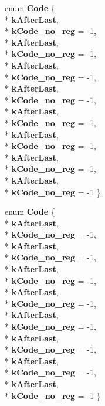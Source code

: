 \begin{DoxyCompactItemize}
\item 
enum {\bfseries Code} \{ \\*
{\bfseries k\+After\+Last}, 
\\*
{\bfseries k\+Code\+\_\+no\+\_\+reg} = -\/1, 
\\*
{\bfseries k\+After\+Last}, 
\\*
{\bfseries k\+Code\+\_\+no\+\_\+reg} = -\/1, 
\\*
{\bfseries k\+After\+Last}, 
\\*
{\bfseries k\+Code\+\_\+no\+\_\+reg} = -\/1, 
\\*
{\bfseries k\+After\+Last}, 
\\*
{\bfseries k\+Code\+\_\+no\+\_\+reg} = -\/1, 
\\*
{\bfseries k\+After\+Last}, 
\\*
{\bfseries k\+Code\+\_\+no\+\_\+reg} = -\/1, 
\\*
{\bfseries k\+After\+Last}, 
\\*
{\bfseries k\+Code\+\_\+no\+\_\+reg} = -\/1, 
\\*
{\bfseries k\+After\+Last}, 
\\*
{\bfseries k\+Code\+\_\+no\+\_\+reg} = -\/1, 
\\*
{\bfseries k\+After\+Last}, 
\\*
{\bfseries k\+Code\+\_\+no\+\_\+reg} = -\/1
 \}\hypertarget{structv8_1_1internal_1_1_register_adca23c370f4ac91047f79bd63778e75c}{}\label{structv8_1_1internal_1_1_register_adca23c370f4ac91047f79bd63778e75c}

\item 
enum {\bfseries Code} \{ \\*
{\bfseries k\+After\+Last}, 
\\*
{\bfseries k\+Code\+\_\+no\+\_\+reg} = -\/1, 
\\*
{\bfseries k\+After\+Last}, 
\\*
{\bfseries k\+Code\+\_\+no\+\_\+reg} = -\/1, 
\\*
{\bfseries k\+After\+Last}, 
\\*
{\bfseries k\+Code\+\_\+no\+\_\+reg} = -\/1, 
\\*
{\bfseries k\+After\+Last}, 
\\*
{\bfseries k\+Code\+\_\+no\+\_\+reg} = -\/1, 
\\*
{\bfseries k\+After\+Last}, 
\\*
{\bfseries k\+Code\+\_\+no\+\_\+reg} = -\/1, 
\\*
{\bfseries k\+After\+Last}, 
\\*
{\bfseries k\+Code\+\_\+no\+\_\+reg} = -\/1, 
\\*
{\bfseries k\+After\+Last}, 
\\*
{\bfseries k\+Code\+\_\+no\+\_\+reg} = -\/1, 
\\*
{\bfseries k\+After\+Last}, 
\\*
{\bfseries k\+Code\+\_\+no\+\_\+reg} = -\/1
 \}\hypertarget{structv8_1_1internal_1_1_register_adca23c370f4ac91047f79bd63778e75c}{}\label{structv8_1_1internal_1_1_register_adca23c370f4ac91047f79bd63778e75c}


\end{DoxyCompactItemize}
